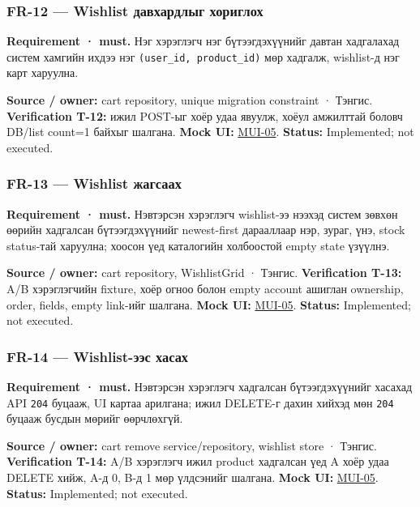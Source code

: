 \documentclass[
  mongolian,
]{article}
\begin{document}
\subsubsection{FR-12 --- Wishlist давхардлыг
хориглох}\label{fr-12-wishlist-ux434ux430ux432ux445ux430ux440ux434ux43bux44bux433-ux445ux43eux440ux438ux433ux43bux43eux445}

\textbf{Requirement · must.} Нэг хэрэглэгч нэг бүтээгдэхүүнийг давтан
хадгалахад систем хамгийн ихдээ нэг \texttt{(user\_id,\ product\_id)}
мөр хадгалж, wishlist-д нэг карт харуулна.

\textbf{Source / owner:} cart repository, unique migration constraint ·
Тэнгис. \textbf{Verification T-12:} ижил POST-ыг хоёр удаа явуулж, хоёул
амжилттай боловч DB/list count=1 байхыг шалгана. \textbf{Mock UI:}
\href{../assets/05-wishlist.png}{MUI-05}. \textbf{Status:} Implemented;
not executed.

\subsubsection{FR-13 --- Wishlist
жагсаах}\label{fr-13-wishlist-ux436ux430ux433ux441ux430ux430ux445}

\textbf{Requirement · must.} Нэвтэрсэн хэрэглэгч wishlist-ээ нээхэд
систем зөвхөн өөрийн хадгалсан бүтээгдэхүүнийг newest-first дарааллаар
нэр, зураг, үнэ, stock status-тай харуулна; хоосон үед каталогийн
холбоостой empty state үзүүлнэ.

\textbf{Source / owner:} cart repository, WishlistGrid · Тэнгис.
\textbf{Verification T-13:} A/B хэрэглэгчийн fixture, хоёр огноо болон
empty account ашиглан ownership, order, fields, empty link-ийг шалгана.
\textbf{Mock UI:} \href{../assets/05-wishlist.png}{MUI-05}.
\textbf{Status:} Implemented; not executed.

\subsubsection{FR-14 --- Wishlist-ээс
хасах}\label{fr-14-wishlist-ux44dux44dux441-ux445ux430ux441ux430ux445}

\textbf{Requirement · must.} Нэвтэрсэн хэрэглэгч хадгалсан
бүтээгдэхүүнийг хасахад API \texttt{204} буцааж, UI картаа арилгана;
ижил DELETE-г дахин хийхэд мөн \texttt{204} буцааж бусдын мөрийг
өөрчлөхгүй.

\textbf{Source / owner:} cart remove service/repository, wishlist store
· Тэнгис. \textbf{Verification T-14:} A/B хэрэглэгч ижил product
хадгалсан үед A хоёр удаа DELETE хийж, A-д 0, B-д 1 мөр үлдсэнийг
шалгана. \textbf{Mock UI:} \href{../assets/05-wishlist.png}{MUI-05}.
\textbf{Status:} Implemented; not executed.
\end{document}
